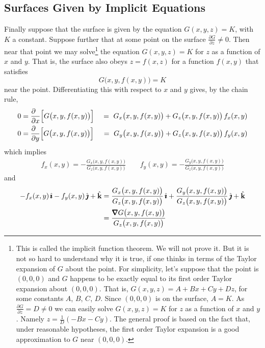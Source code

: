 \subsection{Surfaces Given by Implicit Equations}
Finally suppose that the surface is given by the equation
$G(x,y,z)=K$, with $K$ a constant. Suppose further that at some point 
on the surface $\frac{\partial G}{\partial z} \ne 0$. Then near that point 
we may solve\footnote{This is called the implicit function theorem. We 
will not prove it. But it is not so hard to understand why it is true, if one thinks in terms of the Taylor expansion of
$G$ about the point. For simplicity, let's suppose that the point is
$(0,0,0)$ and $G$ happens to be exactly equal to its first order 
Taylor expansion about $(0,0,0)$. That is, $G(x,y,z) = A +Bx +Cy +Dz$,
for some constants $A$, $B$, $C$, $D$. Since $(0,0,0)$ is on the surface,
$A=K$. As $\frac{\partial G}{\partial z}=D \ne 0$  we can easily solve
$G(x,y,z)=K$ for $z$ as a function of $x$ and $y$. Namely
$z=\frac{1}{D}(-Bx-Cy)$. The general proof is based on the fact that,
under reasonable hypotheses, the first order Taylor expansion is a 
good approximation to $G$ near $(0,0,0)$.} 
the equation $G(x,y,z)=K$ for $z$ as a function of $x$ and $y$. That is, the surface also obeys $z=f(x,z)$ for a function $f(x,y)$
that satisfies 
\begin{equation*}
G\big(x,y,f(x,y)\big) = K
\end{equation*}
near the point.
Differentiating this with respect to $x$ and $y$ gives, by the chain rule,
\begin{alignat*}{3}
0&=\frac{\partial\hfill}{\partial x}\Big[G\big(x,y,f(x,y)\big)\Big]
 &\ =\ G_x\big(x,y,f(x,y)\big) + G_z\big(x,y,f(x,y)\big)\,f_x(x,y) \\ 
0&=\frac{\partial\hfill}{\partial y}\Big[G\big(x,y,f(x,y)\big)\Big]
 &\ =\ G_y\big(x,y,f(x,y)\big) + G_z\big(x,y,f(x,y)\big)\,f_y(x,y)
\end{alignat*}
which implies
\begin{align*}
f_x(x,y) = -\frac{G_x\big(x,y,f(x,y)\big)}{G_z\big(x,y,f(x,y)\big)}
\qquad
f_y(x,y) = -\frac{G_y\big(x,y,f(x,y)\big)}{G_z\big(x,y,f(x,y)\big)}
\end{align*}
and
\begin{align*}
-f_x(x,y)\,\hi - f_y(x,y)\,\hj + \hk
&=\frac{G_x\big(x,y,f(x,y)\big)}{G_z\big(x,y,f(x,y)\big)}\,\hi+
\frac{G_y\big(x,y,f(x,y)\big)}{G_z\big(x,y,f(x,y)\big)}\,\hj+\hk \\
&=\frac{\vnabla G\big(x,y,f(x,y)\big)}{G_z\big(x,y,f(x,y)\big)}
\end{align*}
